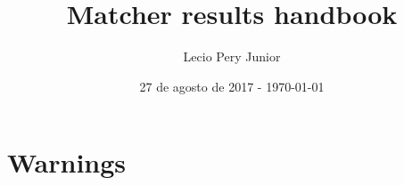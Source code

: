 \documentclass[12pt,oneside,a4paper]{book}
\begin{document}
  
  \title{ Matcher results handbook }
  \author{ Lecio Pery Junior }
  \date{ 27 de agosto de 2017 - \today }
  \maketitle
  
  \part{ Warnings }
    
    
  
  
    
    
    
    
    
    
    
    
    
    
    
    
    
    
    
    
    
    
    
    
    
    
    
    
    
    
    
    
    
    
    
    
    
    
    
    
    
    
    
\end{document}
